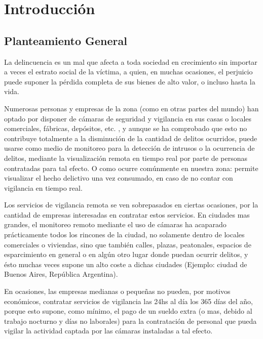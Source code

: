 \documentclass[a4paper,12pt,oneside,spanish]{book}
\begin{document}
\newpage
\tableofcontents

\newpage
\listoffigures


\newpage
\setlength{\parskip}{1.2em}
\chapter{Introducción}
\section{Planteamiento General}
La delincuencia es un mal que afecta a toda sociedad en crecimiento sin importar a veces el estrato social de la víctima, a quien, en muchas ocasiones, el perjuicio puede suponer la pérdida completa de sus bienes de alto valor, o incluso hasta la vida.\par 
 
Numerosas personas y empresas de la zona (como en otras partes del mundo) han optado por disponer de cámaras de seguridad y vigilancia en sus casas o locales comerciales, fábricas, depósitos, etc. , y aunque se ha comprobado que esto no contribuye totalmente a la disminución de la cantidad de delitos ocurridos, puede usarse como medio de monitoreo para la detección de intrusos o la ocurrencia de delitos, mediante la visualización remota en tiempo real por parte de personas contratadas para tal efecto. O como ocurre comúnmente en nuestra zona: permite visualizar el hecho delictivo una vez consumado, en caso de no contar con vigilancia en tiempo real.
\par 

Los servicios de vigilancia remota se ven sobrepasados en ciertas ocasiones, por la cantidad de empresas interesadas en contratar estos servicios. En ciudades mas grandes, el monitoreo remoto mediante el uso de cámaras ha acaparado prácticamente todos los rincones de la ciudad, no solamente dentro de locales comerciales o viviendas, sino que también calles, plazas, peatonales, espacios de esparcimiento en general o en algún otro lugar donde puedan ocurrir delitos, y ésto muchas veces supone un alto coste a dichas ciudades (Ejemplo: ciudad de Buenos Aires, República Argentina).\par 

En ocasiones, las empresas medianas o pequeñas no pueden, por motivos económicos, contratar servicios de vigilancia las 24hs al día los 365 días del año, porque esto supone, como mínimo, el pago de un sueldo extra (o mas, debido al trabajo nocturno y días no laborales) para la contratación de personal que pueda vigilar la actividad captada por las cámaras instaladas a tal efecto.\par
\end{document}
